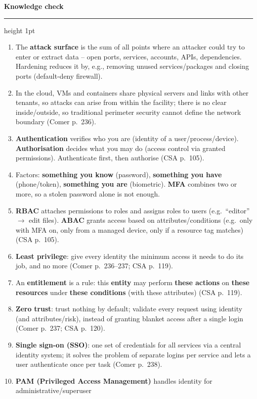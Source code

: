 \documentclass[11pt]{article}
\newcommand{\wbsection}[1]{\par\vspace{11pt}\noindent
  {\large\bfseries\color{kred}#1}\par\vspace{2pt}
  {\color{kred!35}\hrule height 1pt}\par\vspace{6pt}}
\renewcommand{\emph}[1]{\textup{#1}}
\begin{document}
\wbsection{Knowledge check}
\begin{enumerate}
\item The \textbf{attack surface} is the sum of all points where an attacker could try to enter or
      extract data -- open ports, services, accounts, APIs, dependencies. Hardening reduces it by, e.g.,
      removing unused services/packages and closing ports (default-deny firewall).
\item In the cloud, VMs and containers share physical servers and links with other tenants, so attacks
      can arise \emph{from within} the facility; there is no clear inside/outside, so traditional
      perimeter security cannot define the network boundary (Comer p.~236).
\item \textbf{Authentication} verifies \emph{who} you are (identity of a user/process/device).
      \textbf{Authorisation} decides \emph{what} you may do (access control via granted permissions).
      Authenticate first, then authorise (CSA p.~105).
\item Factors: \textbf{something you know} (password), \textbf{something you have} (phone/token),
      \textbf{something you are} (biometric). \textbf{MFA} combines two or more, so a stolen password
      alone is not enough.
\item \textbf{RBAC} attaches permissions to roles and assigns roles to users (e.g.\ ``editor''
      $\rightarrow$ edit files). \textbf{ABAC} grants access based on attributes/conditions (e.g.\
      only with MFA on, only from a managed device, only if a resource tag matches) (CSA p.~105).
\item \textbf{Least privilege}: give every identity the minimum access it needs to do its job, and no
      more (Comer p.~236--237; CSA p.~119).
\item An \textbf{entitlement} is a rule: this \textbf{entity} may perform \textbf{these actions} on
      \textbf{these resources} under \textbf{these conditions} (with these attributes) (CSA p.~119).
\item \textbf{Zero trust}: trust nothing by default; validate \emph{every} request using identity (and
      attributes/risk), instead of granting blanket access after a single login (Comer p.~237; CSA
      p.~120).
\item \textbf{Single sign-on (SSO)}: one set of credentials for all services via a central identity
      system; it solves the problem of separate logins per service and lets a user authenticate once
      per task (Comer p.~238).
\item \textbf{PAM (Privileged Access Management)} handles identity for administrative/superuser

\end{enumerate}
\end{document}
